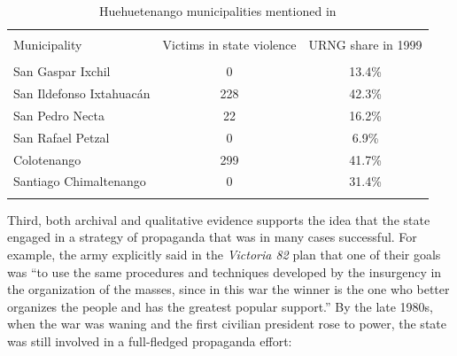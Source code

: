 \documentclass[12pt, notitlepage]{article}
\begin{document}
\begin{table}[!htbp] \centering
  \caption{Huehuetenango municipalities mentioned in \citet{Imparcial:1974aa}}\label{tab:6muni}
  \small

  \begin{tabular}{lcc}
  \\[-1.8ex]\hline
  \hline \\[-1.8ex]
  Municipality & Victims in state violence & URNG share in 1999  \\
  \hline \\[-1.8ex]
  San Gaspar Ixchil & 0 & 13.4\% \\
  San Ildefonso Ixtahuacán & 228 & 42.3\% \\
  San Pedro Necta & 22 & 16.2\% \\
  San Rafael Petzal & 0 & 6.9\% \\
  Colotenango & 299 & 41.7\% \\
  Santiago Chimaltenango & 0 & 31.4\% \\
  \hline
  \hline \\[-1.8ex]
  \end{tabular}

\end{table}

%


Third, both archival and qualitative evidence supports the idea that the state engaged in a strategy of propaganda that was in many cases successful.
For example, the army explicitly said in the \textit{Victoria 82} plan that one of their goals was ``to use the same procedures and techniques developed by the insurgency in the organization of the masses, since in this war the winner is the one who better organizes the people and has the greatest popular support.'' \citep[quoted in][II, 191]{CEH:1999aa}
By the late 1980s, when the war was waning and the first civilian president rose to power, the state was still involved in a full-fledged propaganda effort:
\end{document}
